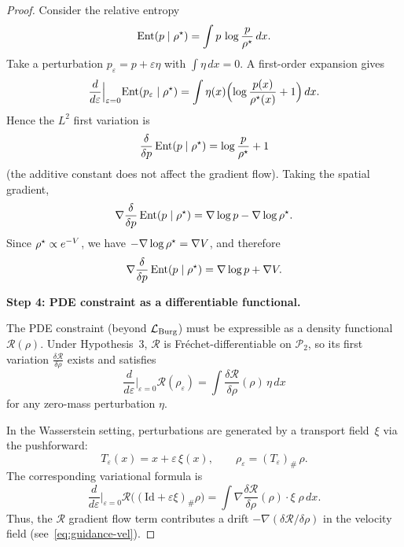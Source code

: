 \begin{proof}
Consider the relative entropy
\begin{equation}
\mathrm{Ent}(p \mid \rho^{\star}) = \int p\,\log\frac{p}{\rho^{\star}}\,dx.
\end{equation}
Take a perturbation $p_{\varepsilon} = p + \varepsilon\eta$ with $\int\eta\,dx = 0$.
A first-order expansion gives
\begin{equation}
\frac{d}{d\varepsilon}\Big|_{\varepsilon=0} \mathrm{Ent}(p_{\varepsilon} \mid \rho^{\star})
  = \int \eta(x)\Bigl( \log\frac{p(x)}{\rho^{\star}(x)} + 1 \Bigr)\,dx.
\end{equation}
Hence the $L^{2}$ first variation is
\begin{equation}
\frac{\delta}{\delta p}\,\mathrm{Ent}(p \mid \rho^{\star}) = \log\frac{p}{\rho^{\star}} + 1
\end{equation}
(the additive constant does not affect the gradient flow).
Taking the spatial gradient,
\begin{equation}
\label{eq:ent-grad}
\nabla\frac{\delta}{\delta p}\,\mathrm{Ent}(p \mid \rho^{\star})
  = \nabla\log p - \nabla\log\rho^{\star}.
\end{equation}
Since $\rho^{\star} \propto e^{-V}$, we have $-\nabla\log\rho^{\star} = \nabla V$, and therefore
\begin{equation}
\label{eq:ent-var}
\nabla\frac{\delta}{\delta p}\,\mathrm{Ent}(p \mid \rho^{\star}) = \nabla\log p + \nabla V.
\end{equation}

\medskip
\noindent\textbf{Step 4: PDE constraint as a differentiable functional.}

The PDE constraint (beyond $\mathcal{L}_{\mathrm{Burg}}$) must be expressible as a density
functional~$\mathcal{R}(\rho)$.
Under Hypothesis~3, $\mathcal{R}$ is Fr\'{e}chet-differentiable on $\mathcal{P}_{2}$, so
its first variation $\frac{\delta\mathcal{R}}{\delta\rho}$ exists and satisfies
\begin{equation}
\frac{d}{d\varepsilon}\Big|_{\varepsilon=0} \mathcal{R}(\rho_{\varepsilon})
  = \int \frac{\delta\mathcal{R}}{\delta\rho}(\rho)\,\eta\,dx
\end{equation}
for any zero-mass perturbation $\eta$.

In the Wasserstein setting, perturbations are generated by a transport
field~$\xi$ via the pushforward:
\begin{equation}
T_{\varepsilon}(x) = x + \varepsilon\,\xi(x), \qquad
\rho_{\varepsilon} = (T_{\varepsilon})_{\#}\,\rho.
\end{equation}
The corresponding variational formula is
\begin{equation}
\frac{d}{d\varepsilon}\Big|_{\varepsilon=0}
  \mathcal{R}\bigl((\mathrm{Id} + \varepsilon\xi)_{\#}\rho\bigr)
  = \int \nabla\frac{\delta\mathcal{R}}{\delta\rho}(\rho) \cdot \xi\;\rho\,dx.
\end{equation}
Thus, the $\mathcal{R}$ gradient flow term contributes a drift
$-\nabla(\delta\mathcal{R}/\delta\rho)$ in the velocity field (see~\eqref{eq:guidance-vel}).


\end{proof}
